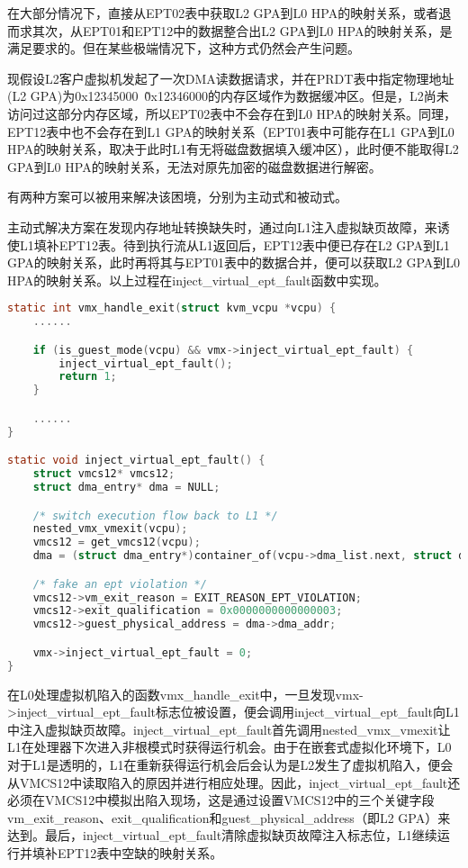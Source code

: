 在大部分情况下，直接从EPT02表中获取L2 GPA到L0 HPA的映射关系，或者退而求其次，从EPT01和EPT12中的数据整合出L2 GPA到L0 HPA的映射关系，是满足要求的。但在某些极端情况下，这种方式仍然会产生问题。

现假设L2客户虚拟机发起了一次DMA读数据请求，并在PRDT表中指定物理地址(L2 GPA)为0x12345000~\~0x12346000的内存区域作为数据缓冲区。但是，L2尚未访问过这部分内存区域，所以EPT02表中不会存在到L0 HPA的映射关系。同理，EPT12表中也不会存在到L1 GPA的映射关系（EPT01表中可能存在L1 GPA到L0 HPA的映射关系，取决于此时L1有无将磁盘数据填入缓冲区），此时便不能取得L2 GPA到L0 HPA的映射关系，无法对原先加密的磁盘数据进行解密。

有两种方案可以被用来解决该困境，分别为主动式和被动式。

主动式解决方案在发现内存地址转换缺失时，通过向L1注入虚拟缺页故障，来诱使L1填补EPT12表。待到执行流从L1返回后，EPT12表中便已存在L2 GPA到L1 GPA的映射关系，此时再将其与EPT01表中的数据合并，便可以获取L2 GPA到L0 HPA的映射关系。以上过程在inject\_virtual\_ept\_fault函数中实现。

\begin{lstlisting}[language={C}, caption={inject\_virtual\_ept\_fault实现源代码}]
static int vmx_handle_exit(struct kvm_vcpu *vcpu) {
	......

    if (is_guest_mode(vcpu) && vmx->inject_virtual_ept_fault) {
        inject_virtual_ept_fault();
        return 1;
    }

	......
}

static void inject_virtual_ept_fault() {	
    struct vmcs12* vmcs12;
    struct dma_entry* dma = NULL;

    /* switch execution flow back to L1 */
    nested_vmx_vmexit(vcpu);
    vmcs12 = get_vmcs12(vcpu);
    dma = (struct dma_entry*)container_of(vcpu->dma_list.next, struct dma_entry, next_entry);

    /* fake an ept violation */
    vmcs12->vm_exit_reason = EXIT_REASON_EPT_VIOLATION;
    vmcs12->exit_qualification = 0x0000000000000003;
    vmcs12->guest_physical_address = dma->dma_addr;

    vmx->inject_virtual_ept_fault = 0;
}
\end{lstlisting}

在L0处理虚拟机陷入的函数vmx\_handle\_exit中，一旦发现vmx->inject\_virtual\_ept\_fault标志位被设置，便会调用inject\_virtual\_ept\_fault向L1中注入虚拟缺页故障。inject\_virtual\_ept\_fault首先调用nested\_vmx\_vmexit让L1在处理器下次进入非根模式时获得运行机会。由于在嵌套式虚拟化环境下，L0对于L1是透明的，L1在重新获得运行机会后会认为是L2发生了虚拟机陷入，便会从VMCS12中读取陷入的原因并进行相应处理。因此，inject\_virtual\_ept\_fault还必须在VMCS12中模拟出陷入现场，这是通过设置VMCS12中的三个关键字段vm\_exit\_reason、exit\_qualification和guest\_physical\_address（即L2 GPA）来达到。最后，inject\_virtual\_ept\_fault清除虚拟缺页故障注入标志位，L1继续运行并填补EPT12表中空缺的映射关系。

